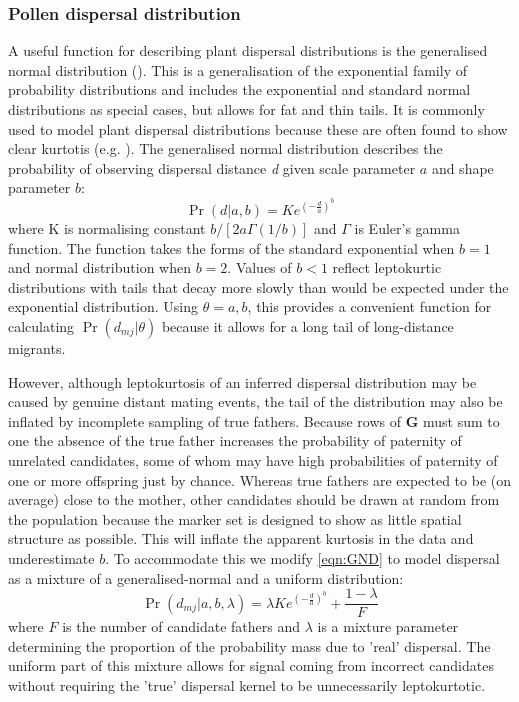 \documentclass[10pt, a4paper, twocolumn]{article} %
\begin{document}
\subsubsection{Pollen dispersal distribution}

A useful function for describing plant dispersal distributions is the generalised normal distribution (\cite{clark1998trees,Nadarajah2005,kremer2012long}). This is a generalisation of the exponential family of probability distributions and includes the exponential and standard normal distributions as special cases, but allows for fat and thin tails. It is commonly used to model plant dispersal distributions because these are often found to show clear kurtotis (e.g. \cite{austerlitz2004using, robledo2005patterns, klein2008pollen, burczyk2019patterns, field2011importance, ottewell2012pollen}). The generalised normal distribution describes the probability of observing dispersal distance \textit{d} given scale parameter $a$ and shape parameter $b$:
\begin{equation}
\Pr(d|a,b) =K e^{  (-\frac{d}{a} )^b }
\label{eqn:GND}
\end{equation}
where K is normalising constant $b/[2a\Gamma(1/b)]$ and $\Gamma$ is Euler's gamma function. The function takes the forms of the standard exponential when $b=1$ and normal distribution when $b=2$. Values of $b<1$ reflect leptokurtic distributions with tails that decay more slowly than would be expected under the exponential distribution. Using $\theta={a,b}$, this provides a convenient function for calculating $\Pr(d_{mj} | \theta)$ because it allows for a long tail of long-distance migrants.

However, although leptokurtosis of an inferred dispersal distribution may be caused by genuine distant mating events, the tail of the distribution may also be inflated by incomplete sampling of true fathers. Because rows of \textbf{G} must sum to one the absence of the true father increases the probability of paternity of unrelated candidates, some of whom may have high probabilities of paternity of one or more offspring just by chance. Whereas true fathers are expected to be (on average) close to the mother, other candidates should be drawn at random from the population because the marker set is designed to show as little spatial structure as possible. This will inflate the apparent kurtosis in the data and underestimate $b$. To accommodate this we modify \ref{eqn:GND} to model dispersal as a mixture of a generalised-normal and a uniform distribution:
\begin{equation}\label{eqn:mixture_model}
\Pr(d_{mj} | a,b,\lambda) = \lambda K e^{  (-\frac{d}{a} )^b } + \frac{1-\lambda}{F}
\end{equation}
where $F$ is the number of candidate fathers and $\lambda$ is a mixture parameter determining the proportion of the probability mass due to ’real’ dispersal. The uniform part of this mixture allows for signal coming from incorrect candidates without requiring the 'true' dispersal kernel to be unnecessarily leptokurtotic.
\end{document}
